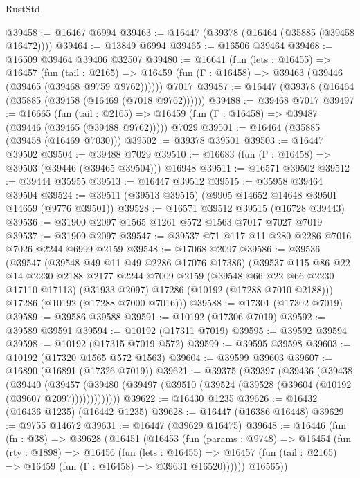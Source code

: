 \begin{lexlean}{RustStd}
\begin{coremodule}
@39458 := @16467 @6994
@39463 := @16447 (@39378 (@16464 (@35885 (@39458 @16472))))
@39464 := @13849 @6994
@39465 := @16506 @39464
@39468 := @16509 @39464 @39406 @32507
@39480 := @16641
    (fun (lets : @16455) =>
    @16457
      (fun (tail : @2165) =>
      @16459 (fun (Γ : @16458) => @39463 (@39446 (@39465 (@39468 @9759 @9762))))))
    @7017
@39487 := @16447 (@39378 (@16464 (@35885 (@39458 (@16469 (@7018 @9762))))))
@39488 := @39468 @7017
@39497 := @16665
    (fun (tail : @2165) => @16459 (fun (Γ : @16458) => @39487 (@39446 (@39465 (@39488 @9762)))))
    @7029
@39501 := @16464 (@35885 (@39458 (@16469 @7030)))
@39502 := @39378 @39501
@39503 := @16447 @39502
@39504 := @39488 @7029
@39510 := @16683 (fun (Γ : @16458) => @39503 (@39446 (@39465 @39504))) @16948
@39511 := @16571 @39502
@39512 := @39444 @35955
@39513 := @16447 @39512
@39515 := @35958 @39464 @39504
@39524 := @39511 (@39513 @39515) (@9905 @14652 @14648 @39501 @14659 (@9776 @39501))
@39528 := @16571 @39512 @39515 (@16728 @39443)
@39536 := @31900 @2097 @1565 @1261 @572 @1563 @7017 @7027 @7019
@39537 := @31909 @2097
@39547 := @39537 @71 @117 @11 @280 @2286 @7016 @7026 @2244 @6999 @2159
@39548 := @17068 @2097
@39586 := @39536
    (@39547
      (@39548 @49 @11 @49 @2286 @17076 @17386)
      (@39537
        @115
        @86
        @22
        @14
        @2230
        @2188
        @2177
        @2244
        @7009
        @2159
        (@39548 @66 @22 @66 @2230 @17110 @17113)
        (@31933 @2097)
        @17286
        (@10192 (@17288 @7010 @2188)))
      @17286
      (@10192 (@17288 @7000 @7016)))
@39588 := @17301 (@17302 @7019)
@39589 := @39586 @39588
@39591 := @10192 (@17306 @7019)
@39592 := @39589 @39591
@39594 := @10192 (@17311 @7019)
@39595 := @39592 @39594
@39598 := @10192 (@17315 @7019 @572)
@39599 := @39595 @39598
@39603 := @10192 (@17320 @1565 @572 @1563)
@39604 := @39599 @39603
@39607 := @16890 (@16891 (@17326 @7019))
@39621 := @39375
    (@39397
      (@39436
        (@39438
          (@39440
            (@39457
              (@39480 (@39497 (@39510 (@39524 (@39528 (@39604 (@10192 (@39607 @2097)))))))))))))
@39622 := @16430 @1235
@39626 := @16432 (@16436 @1235) (@16442 @1235)
@39628 := @16447 (@16386 @16448)
@39629 := @9755 @14672
@39631 := @16447 (@39629 @16475)
@39648 := @16446
    (fun (fn : @38) =>
    @39628
      (@16451
        (@16453
          (fun (params : @9748) =>
          @16454
            (fun (rty : @1898) =>
            @16456
              (fun (lets : @16455) =>
              @16457 (fun (tail : @2165) => @16459 (fun (Γ : @16458) => @39631 @16520))))))
        @16565))

\end{coremodule}
\end{lexlean}

